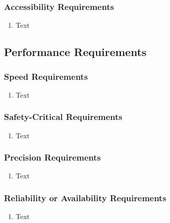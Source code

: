 \documentclass [11pt]{article}
\begin{document}
\subsubsection{Accessibility Requirements }
	\begin{enumerate}[label=\textbf{(\roman*)}]
		\item Text
	\end{enumerate}
 
\subsection{Performance Requirements}

\subsubsection{Speed Requirements }
	\begin{enumerate}[label=\textbf{(\roman*)}]
		\item Text
	\end{enumerate}

\subsubsection{Safety-Critical Requirements }
	\begin{enumerate}[label=\textbf{(\roman*)}]
		\item Text
	\end{enumerate}	

\subsubsection{Precision Requirements}
	\begin{enumerate}[label=\textbf{(\roman*)}]
		\item Text
	\end{enumerate}

\subsubsection{Reliability or Availability Requirements}
	\begin{enumerate}[label=\textbf{(\roman*)}]
		\item Text
	\end{enumerate}
\end{document}
